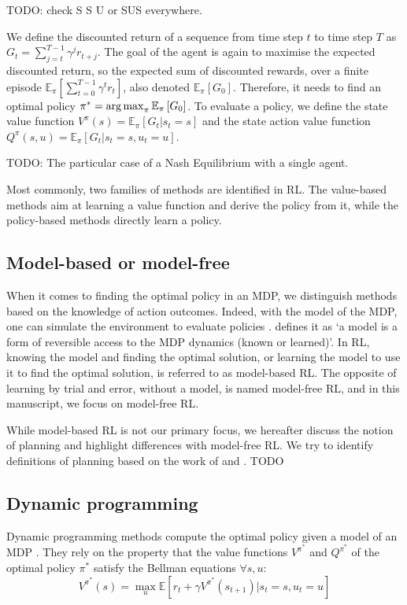 TODO: check S S U or SUS everywhere.

We define the discounted return of a sequence from time step $t$ to time step $T$ as $G_t= \sum_{j=t}^{T-1} \gamma^j r_{t+j}$.
The goal of the agent is again to maximise the expected discounted return, so the expected sum of discounted rewards, over a finite episode $\mathbb{E}_{\pi} \left[\sum_{t=0}^{T-1} \gamma^t r_t \right]$, also denoted $\mathbb{E}_{\pi}\left[ G_0 \right]$.
Therefore, it needs to find an optimal policy $\pi^*=\operatorname*{arg\,max}_\pi \mathbb{E}_{\pi}\left[ G_0 \right]$.
To evaluate a policy, we define the state value function $V^\pi(s) = \mathbb{E}_{\pi}\left[G_t|s_t=s\right]$ and the state action value function $Q^\pi(s, u) = \mathbb{E}_{\pi}\left[G_t|s_t=s, u_t=u\right]$.

TODO: The particular case of a Nash Equilibrium with a single agent.

Most commonly, two families of methods are identified in RL.
The value-based methods aim at learning a value function and derive the policy from it, while the policy-based methods directly learn a policy.

\subsection{Model-based or model-free}
\label{sec:ch2_model_based_vs_model_free}
When it comes to finding the optimal policy in an MDP, we distinguish methods based on the knowledge of action outcomes.
Indeed, with the model of the MDP, one can simulate the environment to evaluate policies \citep{sutton2018reinforcement}.
\cite{moerland2023model} defines it as `a model is a form of reversible access to the MDP dynamics (known or learned)'.
In RL, knowing the model and finding the optimal solution, or learning the model to use it to find the optimal solution, is referred to as model-based RL.
The opposite of learning by trial and error, without a model, is named model-free RL, and in this manuscript, we focus on model-free RL.

While model-based RL is not our primary focus, we hereafter discuss the notion of planning and highlight differences with model-free RL.
We try to identify definitions of planning based on the work of \cite{moerland2023model} and \cite{sutton2018reinforcement}.
TODO

\subsection{Dynamic programming}
Dynamic programming \citep{bellman1966dynamic} methods compute the optimal policy given a model of an MDP \citep{sutton2018reinforcement}.
They rely on the property that the value functions $V^{\pi^*}$ and $Q^{\pi^*}$ of the optimal policy ${\pi^*}$ satisfy the Bellman equations $\forall s, u$:
\begin{equation}
\label{eq:ch2_bellmanV}
    V^{\pi^*}(s) = \max_u \mathbb{E}[r_t + \gamma V^{\pi^*}(s_{t+1})| s_t=s, u_t=u]
\end{equation}

